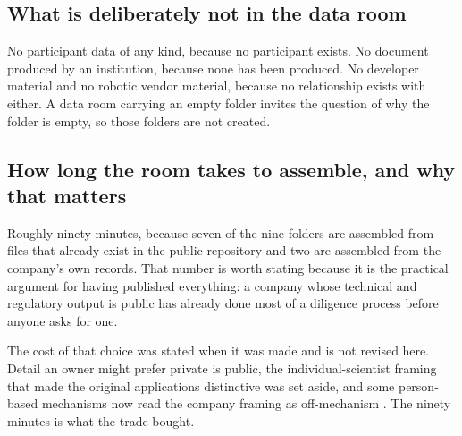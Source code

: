 \subsection{What is deliberately not in the data room}

No participant data of any kind, because no participant exists. No document
produced by an institution, because none has been produced. No developer material
and no robotic vendor material, because no relationship exists with either. A
data room carrying an empty folder invites the question of why the folder is
empty, so those folders are not created.

\subsection{How long the room takes to assemble, and why that matters}

Roughly ninety minutes, because seven of the nine folders are assembled from
files that already exist in the public repository and two are assembled from the
company's own records. That number is worth stating because it is the practical
argument for having published everything: a company whose technical and
regulatory output is public has already done most of a diligence process before
anyone asks for one.

The cost of that choice was stated when it was made and is not revised here.
Detail an owner might prefer private is public, the individual-scientist framing
that made the original applications distinctive was set aside, and some
person-based mechanisms now read the company framing as off-mechanism
\cite{capitalplan2026}. The ninety minutes is what the trade bought.

